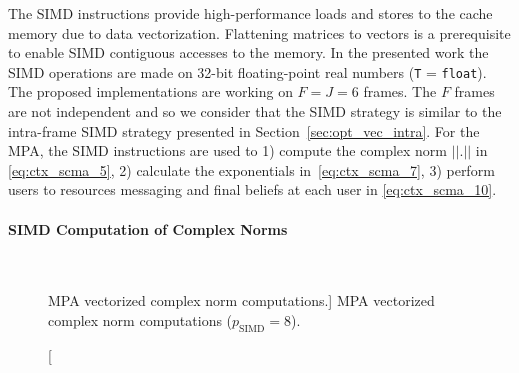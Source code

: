 The SIMD instructions provide high-performance loads and stores to the cache
memory due to data vectorization. Flattening matrices to vectors is a
prerequisite to enable SIMD contiguous accesses to the memory. In the presented
work the SIMD operations are made on 32-bit floating-point real numbers
(\verb|T| = \verb|float|). The proposed implementations are working on
$F = J = 6$ frames. The $F$ frames are not independent and so we consider that
the SIMD strategy is similar to the intra-frame SIMD strategy presented in
Section~\ref{sec:opt_vec_intra}.
For the MPA, the SIMD instructions are used to 1) compute the complex norm
$||.||$ in \eqref{eq:ctx_scma_5}, 2) calculate the exponentials
in~\eqref{eq:ctx_scma_7}, 3) perform users to resources messaging and final
beliefs at each user in \eqref{eq:ctx_scma_10}.

\paragraph{SIMD Computation of Complex Norms}

\begin{figure}[htp]
  \centering
  \\
  \caption
    [MPA vectorized complex norm computations.]
    {MPA vectorized complex norm computations ($p_\text{SIMD} = 8$).}
  \label{fig:opt_scma_simd_norm}
\end{figure}

